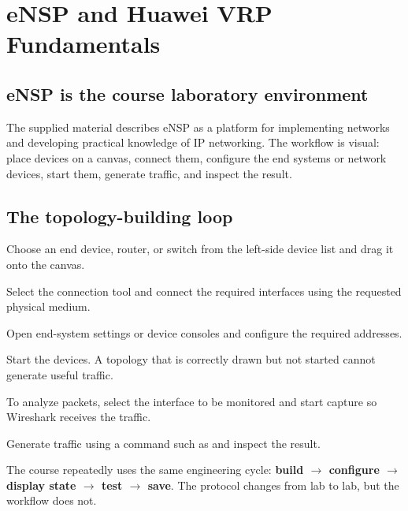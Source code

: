 \chapter{eNSP and Huawei VRP Fundamentals}

\section{eNSP is the course laboratory environment}
The supplied material describes eNSP as a platform for implementing networks and developing practical knowledge of IP networking. The workflow is visual: place devices on a canvas, connect them, configure the end systems or network devices, start them, generate traffic, and inspect the result.


\section{The topology-building loop}
\begin{netsteps}
\item Choose an end device, router, or switch from the left-side device list and drag it onto the canvas.
\item Select the connection tool and connect the required interfaces using the requested physical medium.
\item Open end-system settings or device consoles and configure the required addresses.
\item Start the devices. A topology that is correctly drawn but not started cannot generate useful traffic.
\item To analyze packets, select the interface to be monitored and start capture so Wireshark receives the traffic.
\item Generate traffic using a command such as  and inspect the result.
\end{netsteps}

\begin{keyidea}
The course repeatedly uses the same engineering cycle: \textbf{build $\rightarrow$ configure $\rightarrow$ display state $\rightarrow$ test $\rightarrow$ save}. The protocol changes from lab to lab, but the workflow does not.
\end{keyidea}

